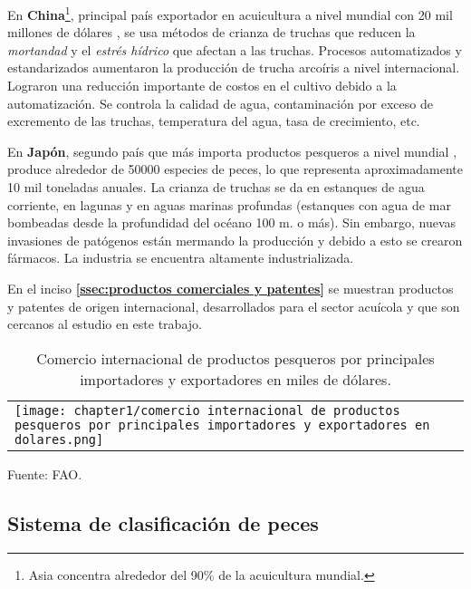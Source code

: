 En \textbf{China}\footnote{Asia concentra alrededor del 90\% de la acuicultura mundial.\citep{Powell2003}}, principal país exportador en acuicultura a nivel mundial con 20 mil millones de dólares \citep[p.~44]{FAO2017}, se usa métodos de crianza de truchas que reducen la \textit{mortandad} y el \textit{estrés hídrico} que afectan a las truchas. Procesos automatizados y estandarizados aumentaron la producción de trucha arcoíris a nivel internacional. Lograron una reducción importante de costos en el cultivo debido a la automatización. Se controla la calidad de agua, contaminación por exceso de excremento de las truchas, temperatura del agua, tasa de crecimiento, etc. \citep[p.~1-6]{2017}

En \textbf{Japón}, segundo país que más importa productos pesqueros a nivel mundial \citep[p.~44]{FAO2017}, produce alrededor de 50000 especies de peces, lo que representa aproximadamente 10 mil toneladas anuales. La crianza de truchas se da en estanques de agua corriente, en lagunas y en aguas marinas profundas (estanques con agua de mar bombeadas desde la profundidad del océano 100 m. o más). Sin embargo, nuevas invasiones de patógenos están mermando la producción y debido a esto se crearon fármacos. La industria se encuentra altamente industrializada. \citep[p.~1-5]{2005} 

En el inciso \textbf{\ref{ssec:productos comerciales y patentes}} se muestran productos y patentes de origen internacional, desarrollados para el sector acuícola y que son cercanos al estudio en este trabajo.

\begin{table}[H]
	\centering	
	\caption{Comercio internacional de productos pesqueros por principales importadores y exportadores en miles de dólares.}
	\label{tbl:comercio internacional de productos pesqueros por principales importadores y exportadores en dolares}
	\begin{tabular}{ l }
		\begin{minipage}{1\textwidth}
			\texttt{[image: chapter1/comercio internacional de productos pesqueros por principales importadores y exportadores en dolares.png]}
		\end{minipage}	
	\end{tabular}
	\begin{myflushleftportland}
		Fuente: FAO.
	\end{myflushleftportland}	
\end{table}

\subsection{Sistema de clasificación de peces}
\label{ssec:sistema de clasificacion de peces}

